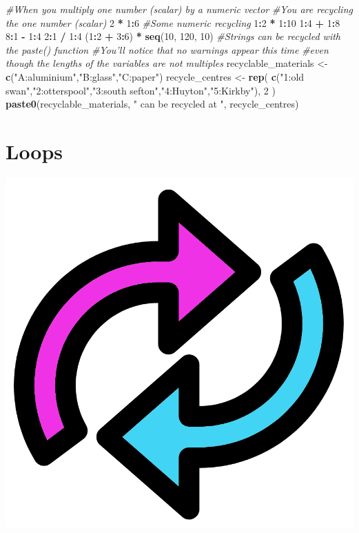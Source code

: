 \documentclass[]{book}
\newenvironment{Shaded}{\begin{snugshade}}{\end{snugshade}}
\newcommand{\KeywordTok}[1]{\textcolor[rgb]{0.13,0.29,0.53}{\textbf{#1}}}
\newcommand{\DecValTok}[1]{\textcolor[rgb]{0.00,0.00,0.81}{#1}}
\newcommand{\StringTok}[1]{\textcolor[rgb]{0.31,0.60,0.02}{#1}}
\newcommand{\CommentTok}[1]{\textcolor[rgb]{0.56,0.35,0.01}{\textit{#1}}}
\newcommand{\OperatorTok}[1]{\textcolor[rgb]{0.81,0.36,0.00}{\textbf{#1}}}
\newcommand{\NormalTok}[1]{#1}
\begin{document}
\begin{Shaded}
\begin{Highlighting}[]
\CommentTok{#When you multiply one number (scalar) by a numeric vector}
\CommentTok{#You are recycling the one number (scalar)}
\DecValTok{2} \OperatorTok{*}\StringTok{ }\DecValTok{1}\OperatorTok{:}\DecValTok{6}
\CommentTok{#Some numeric recycling}
\DecValTok{1}\OperatorTok{:}\DecValTok{2} \OperatorTok{*}\StringTok{ }\DecValTok{1}\OperatorTok{:}\DecValTok{10}
\DecValTok{1}\OperatorTok{:}\DecValTok{4} \OperatorTok{+}\StringTok{ }\DecValTok{1}\OperatorTok{:}\DecValTok{8}
\DecValTok{8}\OperatorTok{:}\DecValTok{1} \OperatorTok{-}\StringTok{ }\DecValTok{1}\OperatorTok{:}\DecValTok{4}
\DecValTok{2}\OperatorTok{:}\DecValTok{1} \OperatorTok{/}\StringTok{ }\DecValTok{1}\OperatorTok{:}\DecValTok{4}
\NormalTok{(}\DecValTok{1}\OperatorTok{:}\DecValTok{2} \OperatorTok{+}\StringTok{ }\DecValTok{3}\OperatorTok{:}\DecValTok{6}\NormalTok{) }\OperatorTok{*}\StringTok{ }\KeywordTok{seq}\NormalTok{(}\DecValTok{10}\NormalTok{, }\DecValTok{120}\NormalTok{, }\DecValTok{10}\NormalTok{)}
\CommentTok{#Strings can be recycled with the paste() function}
\CommentTok{#You'll notice that no warnings appear this time}
\CommentTok{#even though the lengths of the variables are not multiples}
\NormalTok{recyclable_materials <-}\StringTok{ }\KeywordTok{c}\NormalTok{(}\StringTok{"A:aluminium"}\NormalTok{,}\StringTok{"B:glass"}\NormalTok{,}\StringTok{"C:paper"}\NormalTok{)}
\NormalTok{recycle_centres <-}\StringTok{ }\KeywordTok{rep}\NormalTok{(}
  \KeywordTok{c}\NormalTok{(}\StringTok{"1:old swan"}\NormalTok{,}\StringTok{"2:otterspool"}\NormalTok{,}\StringTok{"3:south sefton"}\NormalTok{,}\StringTok{"4:Huyton"}\NormalTok{,}\StringTok{"5:Kirkby"}\NormalTok{),}
  \DecValTok{2}
\NormalTok{)}
\KeywordTok{paste0}\NormalTok{(recyclable_materials, }\StringTok{" can be recycled at "}\NormalTok{, recycle_centres)}
\end{Highlighting}
\end{Shaded}

\section{Loops}\label{loops}

\begin{center}\includegraphics[width=0.2\linewidth]{figures/loop} \end{center}
\end{document}

